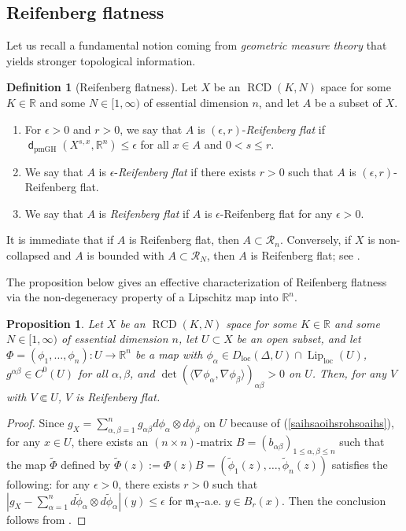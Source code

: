\documentclass[11pt,reqno]{amsart}
\newtheorem{proposition}[theorem]{Proposition}
\theoremstyle{definition}
\newtheorem{definition}[theorem]{Definition}
\numberwithin{equation}{section}
\newcommand{\dR}{\mathbb{R}}
\newcommand{\meas}{\mathfrak{m}}
\DeclareMathOperator{\dist}{\mathsf{d}}
\DeclareMathOperator{\Lip}{Lip}
\DeclareMathOperator{\loc}{loc}
\DeclareMathOperator{\RCD}{RCD}
\begin{document}
\subsection{Reifenberg flatness}\label{subsec:reifen}
Let us recall a fundamental notion coming from \textit{geometric measure theory} that yields stronger topological information.
\begin{definition}[Reifenberg flatness]\label{def:reifenberg}
Let $X$ be an $\RCD(K, N)$ space for some $K \in \mathbb{R}$ and some $N \in [1, \infty)$ of essential dimension $n$, and let $A$ be a subset of $X$. 
\begin{enumerate}
    \item For $\epsilon>0$ and $r>0$, we say that $A$ is $(\epsilon, r)$-\textit{Reifenberg flat} if $
        \dist_{\mathrm{pmGH}}( X^{s, x} , \mathbb{R}^n )\le \epsilon$ for all $x \in A$ and $0<s \le r$.
    \item We say that $A$ is $\epsilon$-\textit{Reifenberg flat} if there exists $r>0$ such that $A$ is $(\epsilon, r)$-Reifenberg flat.
    \item We say that $A$ is \textit{Reifenberg flat} if $A$ is $\epsilon$-Reifenberg flat for any $\epsilon>0$.
\end{enumerate}
\end{definition}
It is immediate that if $A$ is Reifenberg flat, then $A\subset \mathcal{R}_n$. Conversely, if $X$ is non-collapsed and $A$ is bounded with $A \subset \mathcal{R}_N$, then $A$ is Reifenberg flat; see \cite{DG, KM}.


The proposition below gives an effective characterization of Reifenberg flatness via the non-degeneracy property of a Lipschitz map into $\dR^n$.
\begin{proposition}\label{defnbasn}
    Let $X$ be an $\RCD(K, N)$ space for some $K \in \mathbb{R}$ and some $N \in [1, \infty)$ of essential dimension $n$, let $U \subset X$ be an open subset, and let $\Phi=(\phi_1, \ldots, \phi_n):U \to \mathbb{R}^n$ be a map with $\phi_{\alpha} \in D_{\loc}(\Delta, U) \cap \Lip _{\loc}(U)$, $g^{\alpha \beta} \in C^0(U)$ for all $\alpha, \beta$, and 
    $
        \det(\langle \nabla \phi_{\alpha}, \nabla \phi_{\beta}\rangle)_{\alpha \beta} > 0$ on $U$.
    Then, for any $V$ with $V \Subset U$, $V$ is Reifenberg flat.
\end{proposition}
\begin{proof}
Since  $
    g_X=\sum_{\alpha, \beta = 1}^n g_{\alpha \beta} d\phi_{\alpha} \otimes d \phi_{\beta}$  on $U$ because of (\ref{saihsaoihsrohsoaihs}), 
for any $x \in U$, there exists an $(n \times n)$-matrix $B=(b_{\alpha \beta})_{1\leq \alpha , \beta \leq n}$ such that the map $\widetilde \Phi$ defined by $
    \widetilde \Phi(z) := \Phi(z)B=(\tilde \phi_1(z),\ldots, \tilde \phi_n(z))$
satisfies the following:
 for any
$\epsilon>0$, there exists $r>0$ such that 
$
    | g_X -\sum_{\alpha  =  1}^n  d \tilde \phi_{\alpha} \otimes d \tilde \phi_{\alpha}|(y)\le \epsilon$ for $\meas_X$-a.e. $y \in B_r(x)$.
Then the conclusion follows from \cite[Theorem 3.4]{Hisom}.
\end{proof}
\end{document}
